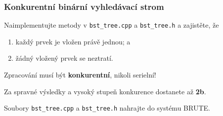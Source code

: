 \documentclass[usenames,dvipsnames,9pt]{beamer}
\begin{document}
\begin{frame}
  \frametitle{Konkurentní binární vyhledávací strom}
  Naimplementujte metody v \texttt{bst\_tree.cpp} a \texttt{bst\_tree.h} a zajistěte, že
  \begin{enumerate}
    \item každý prvek je vložen právě jednou; a
    \item žádný vložený prvek se neztratí.
  \end{enumerate}
  
  Zpracování musí být {\bf konkurentní}, nikoli serielní!
  
  \pause\vspace{1.5em}
  
  Za spravné výsledky a vysoký stupeň konkurence dostanete až {\bf 2b}.
  
    \pause\vspace{1.5em}

Soubory \texttt{bst\_tree.cpp} a \texttt{bst\_tree.h} nahrajte do systému BRUTE.
  

\end{frame}


\framefeedback{}
\end{document}
